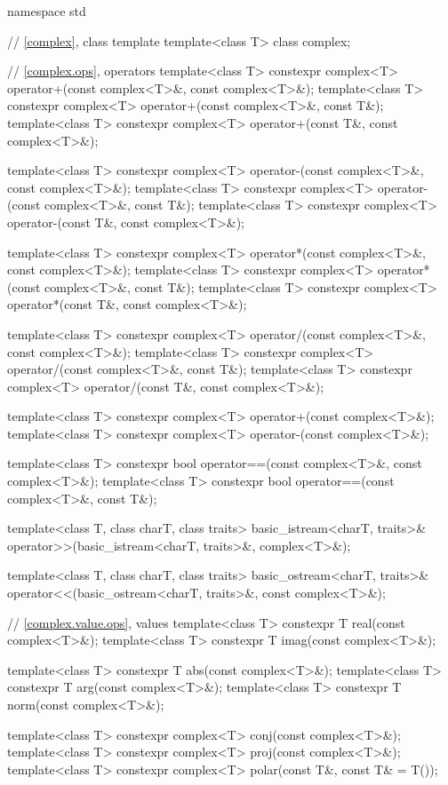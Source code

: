 %
\begin{codeblock}
namespace std {
  // \ref{complex}, class template 
  template<class T> class complex;

  // \ref{complex.ops}, operators
  template<class T> constexpr complex<T> operator+(const complex<T>&, const complex<T>&);
  template<class T> constexpr complex<T> operator+(const complex<T>&, const T&);
  template<class T> constexpr complex<T> operator+(const T&, const complex<T>&);

  template<class T> constexpr complex<T> operator-(const complex<T>&, const complex<T>&);
  template<class T> constexpr complex<T> operator-(const complex<T>&, const T&);
  template<class T> constexpr complex<T> operator-(const T&, const complex<T>&);

  template<class T> constexpr complex<T> operator*(const complex<T>&, const complex<T>&);
  template<class T> constexpr complex<T> operator*(const complex<T>&, const T&);
  template<class T> constexpr complex<T> operator*(const T&, const complex<T>&);

  template<class T> constexpr complex<T> operator/(const complex<T>&, const complex<T>&);
  template<class T> constexpr complex<T> operator/(const complex<T>&, const T&);
  template<class T> constexpr complex<T> operator/(const T&, const complex<T>&);

  template<class T> constexpr complex<T> operator+(const complex<T>&);
  template<class T> constexpr complex<T> operator-(const complex<T>&);

  template<class T> constexpr bool operator==(const complex<T>&, const complex<T>&);
  template<class T> constexpr bool operator==(const complex<T>&, const T&);

  template<class T, class charT, class traits>
    basic_istream<charT, traits>& operator>>(basic_istream<charT, traits>&, complex<T>&);

  template<class T, class charT, class traits>
    basic_ostream<charT, traits>& operator<<(basic_ostream<charT, traits>&, const complex<T>&);

  // \ref{complex.value.ops}, values
  template<class T> constexpr T real(const complex<T>&);
  template<class T> constexpr T imag(const complex<T>&);

  template<class T> constexpr T abs(const complex<T>&);
  template<class T> constexpr T arg(const complex<T>&);
  template<class T> constexpr T norm(const complex<T>&);

  template<class T> constexpr complex<T> conj(const complex<T>&);
  template<class T> constexpr complex<T> proj(const complex<T>&);
  template<class T> constexpr complex<T> polar(const T&, const T& = T());

}
\end{codeblock}
